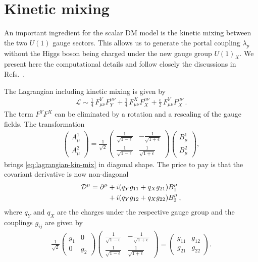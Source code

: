 \documentclass[aps,prd,twocolumn,preprintnumbers,superscriptaddress,nobibnotes,floatfix,longbibliography]{revtex4-1}
\begin{document}
\appendix

\section{Kinetic mixing}
\label{sec:kin-mixing}
An important ingredient for the scalar DM model is the kinetic mixing between the two $U(1)$ gauge sectors.
This allows us to generate the portal coupling $\lambda_p$ without the Higgs boson being charged under the new gauge group $U(1)_X$.
We present here the computational details and follow closely the discussions in Refs.~\cite{1510.02379,1608.07271}.

The Lagrangian including kinetic mixing is given by
\begin{align}
\label{eq:lagrangian-kin-mix}
\mathcal{L}\sim \frac{1}{4}\, F^Y_{\mu \nu } F_Y^{\mu \nu } +\frac{1}{4}\, F^X_{\mu \nu } F_X^{\mu \nu } + \frac{\epsilon}{2}\, F^Y_{\mu \nu } F_X^{\mu \nu }\,.
\end{align}
The term $F^Y F^X$ can be eliminated by a rotation and a rescaling of the gauge fields. The transformation
\begin{align}
\begin{pmatrix} A_\mu^1 \\ A_\mu^2 \end{pmatrix}
 = \frac{1}{\sqrt{2}}
 \begin{pmatrix}
  \frac{1}{\sqrt{1-\epsilon}} & -\frac{1}{\sqrt{1+\epsilon}} \\
  \frac{1}{\sqrt{1-\epsilon}} & \frac{1}{\sqrt{1+\epsilon}}
 \end{pmatrix}
 \begin{pmatrix} B_\mu^1 \\ B_\mu^2 \end{pmatrix},
\end{align}
brings \eqref{eq:lagrangian-kin-mix} in diagonal shape.
The price to pay is that the covariant derivative is now non-diagonal
\begin{align}
 \mathcal{D}^\mu = \partial^\mu &+ i (q_Y g_{11} + q_X g_{21}) B_1^\mu \notag \\ &+ i (q_Y g_{12} + q_X g_{22}) B_2^\mu  \,,
\end{align}
where $q_Y$ and $q_X$ are the charges under the respective gauge group and the couplings $g_{ij}$ are given by
\begin{align}
\label{g-relation-1}
\frac{1}{\sqrt{2}}\begin{pmatrix} g_1 & 0 \\ 0 & g_2 \end{pmatrix}
\begin{pmatrix}
  \frac{1}{\sqrt{1-\epsilon}} & -\frac{1}{\sqrt{1+\epsilon}} \\
  \frac{1}{\sqrt{1-\epsilon}} & \frac{1}{\sqrt{1+\epsilon}}
 \end{pmatrix}
= 
\begin{pmatrix} g_{11} & g_{12} \\ g_{21} & g_{22} \end{pmatrix}.
\end{align}
\end{document}
